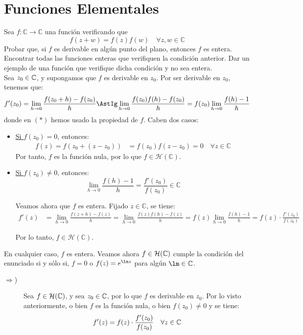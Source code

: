\section{Funciones Elementales}

\begin{ejercicio}
    Sea $f : \mathbb{C} \to \mathbb{C}$ una función verificando que
    \[
        f(z + w) = f(z)f(w) \quad \forall z,w \in \mathbb{C}
    \]
    Probar que, si $f$ es derivable en algún punto del plano, entonces $f$ es entera. Encontrar todas las funciones enteras que verifiquen la condición anterior. Dar un ejemplo de una función que verifique dicha condición y no sea entera.\\

    Sea $z_0\in \mathbb{C}$, y supongamos que $f$ es derivable en $z_0$. Por ser derivable en $z_0$, tenemos que:
    \begin{equation*}
        f'(z_0) = \lim_{h \to 0} \frac{f(z_0 + h) - f(z_0)}{h} \AstIg \lim_{h \to 0} \frac{f(z_0)f(h) - f(z_0)}{h} = f(z_0)\lim_{h \to 0} \frac{f(h) - 1}{h}
    \end{equation*}
    donde en $(\ast)$ hemos usado la propiedad de $f$. Caben dos casos:
    \begin{itemize}
        \item \ul{Si $f(z_0) = 0$}, entonces:
        \begin{align*}
            f(z)=f(z_0 + (z-z_0)) &= f(z_0)f(z-z_0) = 0 \quad \forall z \in \mathbb{C}
        \end{align*}
        Por tanto, $f$ es la función nula, por lo que $f\in \mathcal{H}(\mathbb{C})$.

        \item \ul{Si $f(z_0) \neq 0$}, entonces:
        \begin{equation*}
            \lim_{h \to 0} \frac{f(h) - 1}{h} = \frac{f'(z_0)}{f(z_0)} \in \mathbb{C}
        \end{equation*}

        Veamos ahora que $f$ es entera. Fijado $z\in \mathbb{C}$, se tiene:
        \begin{align*}
            f'(z) &= \lim_{h \to 0} \frac{f(z + h) - f(z)}{h} = \lim_{h \to 0} \frac{f(z)f(h) - f(z)}{h}
            = f(z)\lim_{h \to 0} \frac{f(h) - 1}{h} = f(z)\cdot \frac{f'(z_0)}{f(z_0)}
        \end{align*}

        Por lo tanto, $f\in \mathcal{H}(\mathbb{C})$.
    \end{itemize}
    En cualquier caso, $f$ es entera. Veamos ahora $f\in \mathcal{H}(\mathbb{C})$ cumple la condición del enunciado si y sólo si, $f=0$ o $f(z) = e^{\lm z}$ para algún $\lm \in \bb{C}$.
    \begin{description}
        \item[$\Longrightarrow$)] Sea $f\in \mathcal{H}(\mathbb{C})$, y sea $z_0\in \mathbb{C}$, por lo que $f$ es derivable en $z_0$. Por lo visto anteriormente, o bien $f$ es la función nula, o bien $f(z_0) \neq 0$ y se tiene:
        \begin{equation*}
            f'(z)=f(z)\cdot \frac{f'(z_0)}{f(z_0)} \quad \forall z\in \mathbb{C}
        \end{equation*}


\end{description}
\end{ejercicio}
